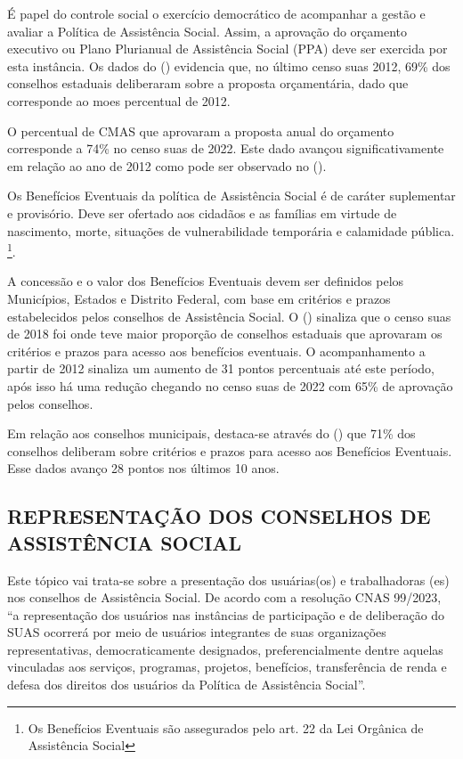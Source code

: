 \documentclass[
  brazilian]{report}
\begin{document}
É papel do controle social o exercício democrático de acompanhar a
gestão e avaliar a Política de Assistência Social. Assim, a aprovação do
orçamento executivo ou Plano Plurianual de Assistência Social (PPA) deve
ser exercida por esta instância. Os dados do ()
evidencia que, no último censo suas 2012, 69\% dos conselhos estaduais
deliberaram sobre a proposta orçamentária, dado que corresponde ao moes
percentual de 2012.

O percentual de CMAS que aprovaram a proposta anual do orçamento
corresponde a 74\% no censo suas de 2022. Este dado avançou
significativamente em relação ao ano de 2012 como pode ser observado no
().

Os Benefícios Eventuais da política de Assistência Social é de caráter
suplementar e provisório. Deve ser ofertado aos cidadãos e as famílias
em virtude de nascimento, morte, situações de vulnerabilidade temporária
e calamidade pública.
\footnote{Os Benefícios Eventuais são assegurados pelo art. 22 da Lei Orgânica de Assistência Social}.

A concessão e o valor dos Benefícios Eventuais devem ser definidos pelos
Municípios, Estados e Distrito Federal, com base em critérios e prazos
estabelecidos pelos conselhos de Assistência Social. O
() sinaliza que o censo suas de 2018 foi onde teve
maior proporção de conselhos estaduais que aprovaram os critérios e
prazos para acesso aos benefícios eventuais. O acompanhamento a partir
de 2012 sinaliza um aumento de 31 pontos percentuais até este período,
após isso há uma redução chegando no censo suas de 2022 com 65\% de
aprovação pelos conselhos.

Em relação aos conselhos municipais, destaca-se através do
() que 71\% dos conselhos deliberam sobre critérios e
prazos para acesso aos Benefícios Eventuais. Esse dados avanço 28 pontos
nos últimos 10 anos.

\hypertarget{representauxe7uxe3o-dos-conselhos-de-assistuxeancia-social}{%
\subsection{REPRESENTAÇÃO DOS CONSELHOS DE ASSISTÊNCIA
SOCIAL}\label{representauxe7uxe3o-dos-conselhos-de-assistuxeancia-social}}

Este tópico vai trata-se sobre a presentação dos usuárias(os) e
trabalhadoras (es) nos conselhos de Assistência Social. De acordo com a
resolução CNAS 99/2023, ``a representação dos usuários nas instâncias de
participação e de deliberação do SUAS ocorrerá por meio de usuários
integrantes de suas organizações representativas, democraticamente
designados, preferencialmente dentre aquelas vinculadas aos serviços,
programas, projetos, benefícios, transferência de renda e defesa dos
direitos dos usuários da Política de Assistência Social''.
\end{document}
